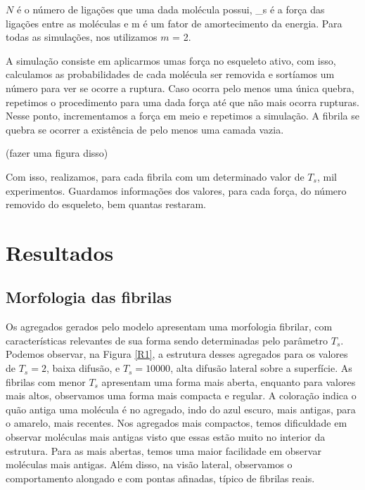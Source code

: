 \documentclass{article}
\begin{document}
        \noindent $N$ é o número de ligações que uma dada molécula possui, \sigma_{s} é a força das ligações entre as moléculas e m é um fator de 
        amortecimento da energia\cite{Parkinson1997,2013}. Para todas as simulações, nos utilizamos $m$ = 2.

        A simulação consiste em aplicarmos umas força no esqueleto ativo, com isso, calculamos as probabilidades de cada molécula ser removida e sortíamos um número para ver se ocorre a ruptura. Caso ocorra pelo menos uma única quebra, repetimos o procedimento para uma dada força até que não mais ocorra rupturas. Nesse ponto, incrementamos a força em meio e repetimos a simulação. A fibrila se quebra se ocorrer a existência de pelo menos uma camada vazia.

        (fazer uma figura disso)

        Com isso, realizamos, para cada fibrila com um determinado valor de $T_{s}$, mil experimentos. Guardamos informações dos valores, para cada força, do número removido do esqueleto, bem quantas restaram.


\section{Resultados}
    \subsection{Morfologia das fibrilas}

    Os agregados gerados pelo modelo apresentam uma morfologia fibrilar, com características relevantes de sua forma 
    sendo determinadas pelo parâmetro \(T_{s}\). Podemos observar, na Figura \ref{R1}, a estrutura desses agregados 
    para os valores de \(T_{s} = 2\), baixa difusão, e \(T_{s} = 10000\), alta difusão lateral sobre a superfície. As 
    fibrilas com menor \(T_{s}\) apresentam uma forma mais aberta, enquanto para valores mais altos, observamos uma 
    forma mais compacta e regular. A coloração indica o quão antiga uma molécula é no agregado, indo do azul escuro, 
    mais antigas, para o amarelo, mais recentes. Nos agregados mais compactos, temos dificuldade em observar moléculas
    mais antigas visto que essas estão muito no interior da estrutura. Para as mais abertas, temos uma maior facilidade
    em observar moléculas mais antigas. Além disso, na visão lateral, observamos o comportamento alongado e com pontas 
    afinadas, típico de fibrilas reais. 
\end{document}
